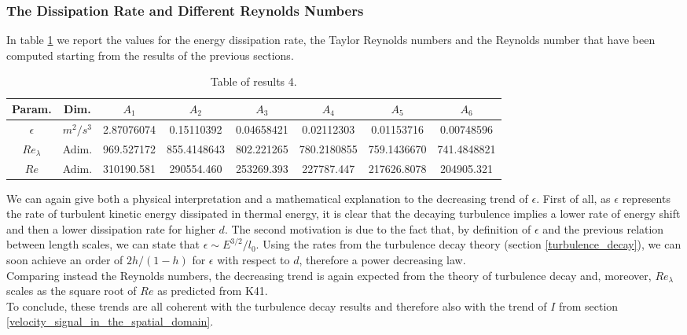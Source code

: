 \documentclass[11pt,titlepage]{article}
\begin{document}
\subsubsection{The Dissipation Rate and Different Reynolds Numbers}
In table \ref{tab4} we report the values for the energy dissipation rate, the Taylor Reynolds numbers and the Reynolds number that have been computed starting from the results of the previous sections. \\

\begin{table}[h!]
\centering
\caption{Table of results 4.} \label{tab4}
    \begin{tabular}{ | c | c | c | c | c | c | c | c |}
        \hline
        Param. & Dim. & $A_1$ & $A_2$ & $A_3$ & $A_4$ & $A_5$ & $A_6$ \\
        \hline
        $\epsilon$ & $m^2/s^3$&2.87076074& 0.15110392& 0.04658421& 0.02112303& 0.01153716 &0.00748596  \\
        \hline
        $Re_\lambda$ & Adim. & 969.527172 & 855.4148643& 802.221265 & 780.2180855& 759.1436670&
        741.4848821 \\
        \hline
        $Re$& Adim. &310190.581 & 290554.460& 253269.393 &227787.447&
        217626.8078 &204905.321 \\
        \hline
    \end{tabular}
\end{table}
We can again give both a physical interpretation and a mathematical explanation to the decreasing trend of $\epsilon$. First of all, as $\epsilon$ represents the rate of turbulent kinetic energy dissipated in thermal energy, it is clear that the decaying turbulence implies a lower rate of energy shift and then a lower dissipation rate for higher $d$. The second motivation is due to the fact that, by definition of $\epsilon$ and the previous relation between length scales, we can state that $\epsilon \sim E^{3/2}/l_0$. Using the rates from the turbulence decay theory (section \ref{turbulence_decay}), we can soon achieve an order of $2h/(1-h)$ for $\epsilon$ with respect to $d$, therefore a power decreasing law. \\
Comparing instead the Reynolds numbers, the decreasing trend is again expected from the theory of turbulence decay and, moreover, $Re_{\lambda}$ scales as the square root of $Re$ as predicted from K41. \\
To conclude, these trends are all coherent with the turbulence decay results and therefore also with the trend of $I$ from section \ref{velocity_signal_in_the_spatial_domain}.
\end{document}
